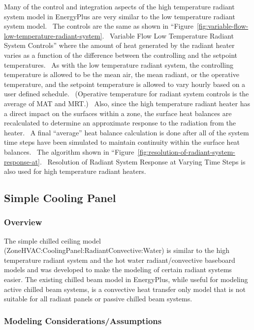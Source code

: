 Many of the control and integration aspects of the high temperature radiant system model in EnergyPlus are very similar to the low temperature radiant system model.~ The controls are the same as shown in ``Figure~\ref{fig:variable-flow-low-temperature-radiant-system}.~ Variable Flow Low Temperature Radiant System Controls'' where the amount of heat generated by the radiant heater varies as a function of the difference between the controlling and the setpoint temperatures.~ As with the low temperature radiant system, the controlling temperature is allowed to be the mean air, the mean radiant, or the operative temperature, and the setpoint temperature is allowed to vary hourly based on a user defined schedule.~ (Operative temperature for radiant system controls is the average of MAT and MRT.)~ Also, since the high temperature radiant heater has a direct impact on the surfaces within a zone, the surface heat balances are recalculated to determine an approximate response to the radiation from the heater.~ A final ``average'' heat balance calculation is done after all of the system time steps have been simulated to maintain continuity within the surface heat balances.~ The algorithm shown in ``Figure~\ref{fig:resolution-of-radiant-system-response-at}.~ Resolution of Radiant System Response at Varying Time Steps is also used for high temperature radiant heaters.

\subsection{Simple Cooling Panel}\label{simple-cooling-panel}

\subsubsection{Overview}\label{overview}

The simple chilled ceiling model (ZoneHVAC:CoolingPanel:RadiantConvective:Water) is similar to the high temperature radiant system and the hot water radiant/convective baseboard models and was developed to make the modeling of certain radiant systems easier.  The existing chilled beam model in EnergyPlus, while useful for modeling active chilled beam systems, is a convective heat transfer only model that is not suitable for all radiant panels or passive chilled beam systems.

\subsubsection{Modeling Considerations/Assumptions}\label{modeling-considerations-assumptions}

